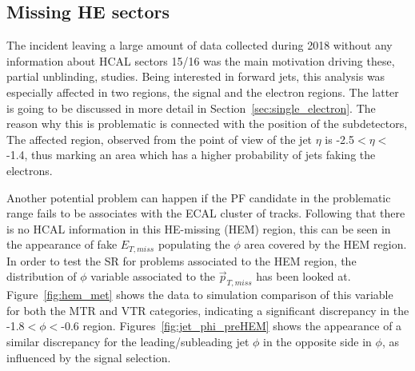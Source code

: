 \subsection{Missing HE sectors}
\hspace{10pt} The incident leaving a large amount of data collected during 2018 without any information about HCAL sectors 15/16 was the main motivation driving these, partial unblinding, studies. Being interested in forward jets, this analysis was especially affected in two regions, the signal and the electron regions. The latter is going to be discussed in more detail in Section~\ref{sec:single_electron}. The reason why this is problematic is connected with the position of the subdetectors, The affected region, observed from the point of view of the jet $\eta$ is -2.5$<\eta<$-1.4, thus marking an area which has a higher probability of jets faking the electrons.

\hspace{10pt} Another potential problem can happen if the PF candidate in the problematic range fails to be associates with the ECAL cluster of tracks. Following that there is no HCAL information in this HE-missing (HEM) region, this can be seen in the appearance of fake $E_{T,miss}$ populating the $\phi$ area covered by the HEM region. In order to test the SR for problems associated to the HEM region, the distribution of $\phi$ variable associated to the $\vec{p}_{T, miss}$ has been looked at. Figure~\ref{fig:hem_met} shows the data to simulation comparison of this variable for both the MTR and VTR categories, indicating a significant discrepancy in the -1.8$<\phi<$-0.6 region. Figures~\ref{fig:jet_phi_preHEM} shows the appearance of a similar discrepancy for the leading/subleading jet $\phi$ in the opposite side in $\phi$, as influenced by the signal selection. 



